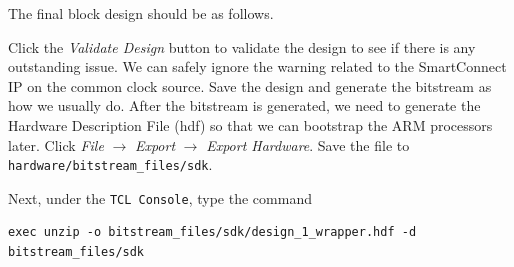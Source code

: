 \documentclass[11pt]{article}
\begin{document}
\begin{appendices}
The final block design should be as follows.

\begin{center}
\end{center}

Click the \emph{Validate Design} button to validate the design to see if there is any outstanding issue. We can safely ignore the warning related to the SmartConnect IP on the common clock source. Save the design and generate the bitstream as how we usually do. After the bitstream is generated, we need to generate the Hardware Description File (hdf) so that we can bootstrap the ARM processors later. Click \emph{File} $\rightarrow$ \emph{Export} $\rightarrow$ \emph{Export Hardware}. Save the file to \verb|hardware/bitstream_files/sdk|.

\begin{center}
\end{center}


Next, under the \texttt{TCL Console}, type the command

\begin{verbatim}
exec unzip -o bitstream_files/sdk/design_1_wrapper.hdf -d bitstream_files/sdk
\end{verbatim}


\end{appendices}
\end{document}
